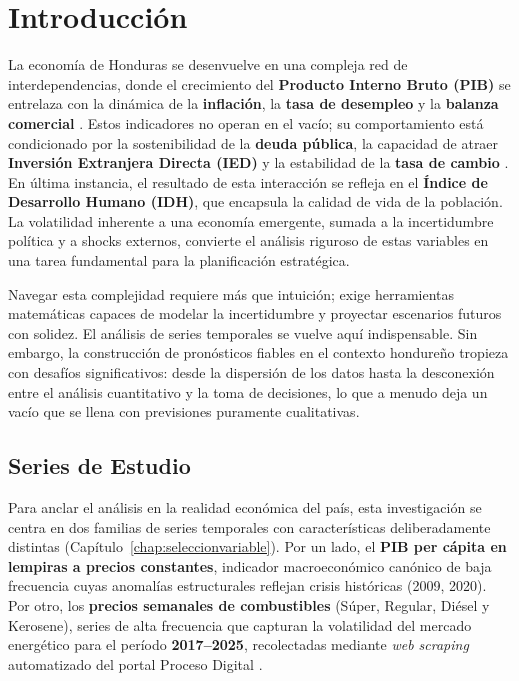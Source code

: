\chapter{Introducción}
\label{chap:introtesis}

La economía de Honduras se desenvuelve en una compleja red de
interdependencias, donde el crecimiento del \textbf{Producto Interno
Bruto (PIB)} se entrelaza con la dinámica de la \textbf{inflación},
la \textbf{tasa de desempleo} y la \textbf{balanza comercial}
\cite{EconHonduras, WorldBankGDP}.  Estos indicadores no operan en
el vacío; su comportamiento está condicionado por la sostenibilidad
de la \textbf{deuda pública}, la capacidad de atraer \textbf{Inversión
Extranjera Directa (IED)} y la estabilidad de la \textbf{tasa de
cambio} \cite{BCH2023, WorldBank2023}.  En última instancia, el
resultado de esta interacción se refleja en el \textbf{Índice de
Desarrollo Humano (IDH)}, que encapsula la calidad de vida de la
población.  La volatilidad inherente a una economía emergente,
sumada a la incertidumbre política y a shocks externos, convierte
el análisis riguroso de estas variables en una tarea fundamental
para la planificación estratégica.

Navegar esta complejidad requiere más que intuición; exige
herramientas matemáticas capaces de modelar la incertidumbre y
proyectar escenarios futuros con solidez.  El análisis de series
temporales se vuelve aquí indispensable.  Sin embargo, la
construcción de pronósticos fiables en el contexto hondureño
tropieza con desafíos significativos: desde la dispersión de los
datos hasta la desconexión entre el análisis cuantitativo y la
toma de decisiones, lo que a menudo deja un vacío que se llena con
previsiones puramente cualitativas.

\section{Series de Estudio}

Para anclar el análisis en la realidad económica del país, esta
investigación se centra en dos familias de series temporales con
características deliberadamente distintas
(Capítulo~\ref{chap:seleccionvariable}).  Por un lado, el
\textbf{PIB per cápita en lempiras a precios constantes}, indicador
macroeconómico canónico de baja frecuencia cuyas anomalías
estructurales reflejan crisis históricas (2009, 2020).  Por otro,
los \textbf{precios semanales de combustibles} (Súper, Regular,
Diésel y Kerosene), series de alta frecuencia que capturan la
volatilidad del mercado energético para el período
\textbf{2017--2025}, recolectadas mediante \textit{web scraping}
automatizado del portal Proceso Digital \cite{ProcesoHN2025}.

